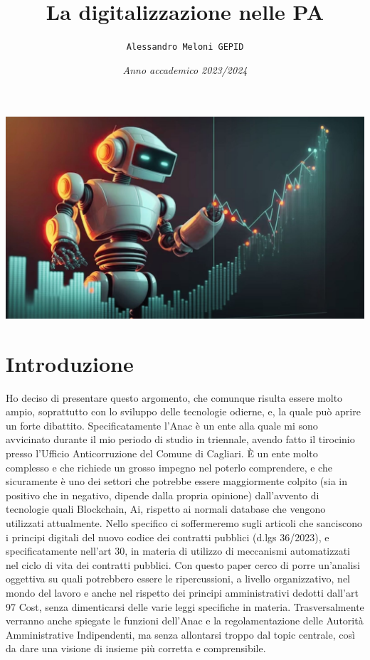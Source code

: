 \documentclass{article}
\title{\textbf{La digitalizzazione nelle PA}}
\author{\texttt{Alessandro Meloni GEPID}}
\date{\textit{Anno accademico 2023/2024}}
\begin{document}
\maketitle
    \includegraphics[width = 0.9\linewidth]{Img.jpg}
\centering \tableofcontents
\newpage\centering
\section{Introduzione}
\flushleft \begin{justify}
Ho deciso di presentare questo argomento, che comunque risulta essere molto ampio, soprattutto con lo sviluppo delle tecnologie odierne, e, la quale può aprire un forte dibattito. Specificatamente l'Anac è un ente alla quale mi sono avvicinato durante il mio periodo di studio in triennale, avendo fatto il tirocinio presso l'Ufficio Anticorruzione del Comune di Cagliari. È un ente molto complesso e che richiede un grosso impegno nel poterlo comprendere, e che sicuramente è uno dei settori che potrebbe essere maggiormente colpito (sia in positivo che in negativo, dipende dalla propria opinione) dall'avvento di tecnologie quali Blockchain, Ai, rispetto ai normali database che vengono utilizzati attualmente. Nello specifico ci soffermeremo sugli articoli che sanciscono i principi digitali del nuovo codice dei contratti pubblici (d.lgs 36/2023), e specificatamente nell'art 30, in materia di utilizzo di meccanismi automatizzati nel ciclo di vita dei contratti pubblici. Con questo paper cerco di porre un'analisi oggettiva su quali potrebbero essere le ripercussioni, a livello organizzativo, nel mondo del lavoro e anche nel rispetto dei principi amministrativi dedotti dall'art 97 Cost, senza dimenticarsi delle varie leggi specifiche in materia.
Trasversalmente verranno anche spiegate le funzioni dell'Anac e la regolamentazione delle Autorità Amministrative Indipendenti, ma senza allontarsi troppo dal topic centrale, così da dare una visione di insieme più corretta e comprensibile.
\end{justify}
\end{document}
